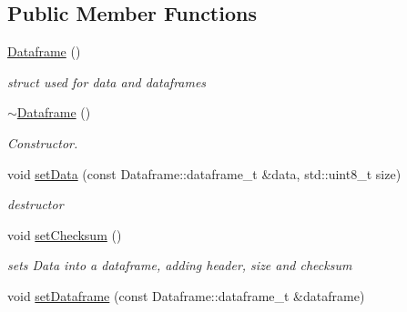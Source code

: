 \subsection*{Public Member Functions}
\begin{DoxyCompactItemize}
\item 
\hyperlink{classDataframe_aa477a9e2ad938c736318df7263e5317c}{Dataframe} ()\hypertarget{classDataframe_aa477a9e2ad938c736318df7263e5317c}{}\label{classDataframe_aa477a9e2ad938c736318df7263e5317c}

\begin{DoxyCompactList}\small\item\em struct used for data and dataframes \end{DoxyCompactList}\item 
\hyperlink{classDataframe_aada0afc4e1f7ba4d5c8a6ff43d1ff8fe}{$\sim$\+Dataframe} ()\hypertarget{classDataframe_aada0afc4e1f7ba4d5c8a6ff43d1ff8fe}{}\label{classDataframe_aada0afc4e1f7ba4d5c8a6ff43d1ff8fe}

\begin{DoxyCompactList}\small\item\em Constructor. \end{DoxyCompactList}\item 
void \hyperlink{classDataframe_aa778c73cc845a6f303965d892f535af2}{set\+Data} (const Dataframe\+::dataframe\+\_\+t \&data, std\+::uint8\+\_\+t size)\hypertarget{classDataframe_aa778c73cc845a6f303965d892f535af2}{}\label{classDataframe_aa778c73cc845a6f303965d892f535af2}

\begin{DoxyCompactList}\small\item\em destructor \end{DoxyCompactList}\item 
void \hyperlink{classDataframe_af06fecbdf1240423ffa226d485381179}{set\+Checksum} ()\hypertarget{classDataframe_af06fecbdf1240423ffa226d485381179}{}\label{classDataframe_af06fecbdf1240423ffa226d485381179}

\begin{DoxyCompactList}\small\item\em sets Data into a dataframe, adding header, size and checksum \end{DoxyCompactList}\item 
void \hyperlink{classDataframe_ab6261590cc8372c851d4d91dc8c040e1}{set\+Dataframe} (const Dataframe\+::dataframe\+\_\+t \&dataframe)\hypertarget{classDataframe_ab6261590cc8372c851d4d91dc8c040e1}{}\label{classDataframe_ab6261590cc8372c851d4d91dc8c040e1}


\end{DoxyCompactItemize}
